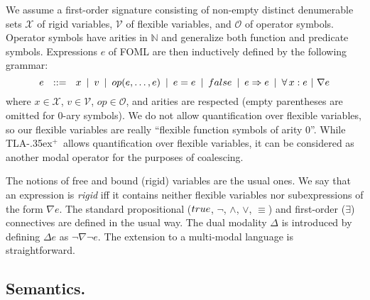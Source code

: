 \documentclass{easychair}
\renewcommand{\implies}{\Rightarrow}
\newcommand{\tlaplus}{\mbox{TLA\kern -.35ex$^+$}\xspace}
\newcommand{\nat}{\mathbb{N}}
\newcommand{\modal}{\nabla}
\newcommand{\dual}{\Delta}
\newcommand{\OO}{\mathcal{O}}
\newcommand{\VV}{\mathcal{V}}
\newcommand{\XX}{\mathcal{X}}
\newcommand{\edmargin}[2]{\marginpar{\raggedright\footnotesize\color{red}#1: #2}}
\newcommand{\edmargin}[2]{}
\def\llnote{\ednote{LL}}
\def\smnote{\ednote{SM}}
\def\smmargin{\edmargin{SM}}
\def\A{\forall\,}
\newcommand{\TRUE}{\mbox{\sc true}}
\newcommand{\FALSE}{\mbox{\sc false}}
\begin{document}
We assume a first-order signature consisting of non-empty distinct denumerable sets
$\XX$ of rigid variables, $\VV$ of flexible variables, and $\OO$ of operator symbols.
Operator symbols have arities in $\nat$ and generalize both function and predicate symbols.
Expressions $e$ of FOML are then inductively defined by the following grammar:
%
 \[
  e\ \ ::=\ \
  x\ \,|\,\
  v\ \,|\,\
  op(e,\ldots,e)\ \,|\,\
  e = e\ \,|\,\
  \FALSE\ \,|\,\
  e \implies e\ \,|\,\
  \A x: e\ |\
  \modal e
 \]
%
%
where $x \in \XX$, $v \in \VV$, $op \in \OO$, and arities are
respected (empty parentheses are omitted for $0$-ary symbols).  We do
not allow quantification over flexible variables, so our flexible
variables are really ``flexible function symbols of arity 0''.
While \tlaplus\ allows quantification
over flexible variables,
it can be considered as another modal operator for the purposes of coalescing.

The notions of free and bound (rigid) variables are the usual ones. We say that
an expression is \emph{rigid} iff it contains neither flexible variables
nor subexpressions of the form
$\modal e$. The
standard propositional ($\TRUE$, $\lnot$, $\land$, $\lor$, $\equiv$)
and first-order ($\exists$) connectives are defined in the usual
way. The dual modality $\dual$ is introduced by defining $\dual e$ as
$\lnot\modal\lnot e$.
The extension to a multi-modal language is straightforward.

\subsection{Semantics.}
\end{document}
